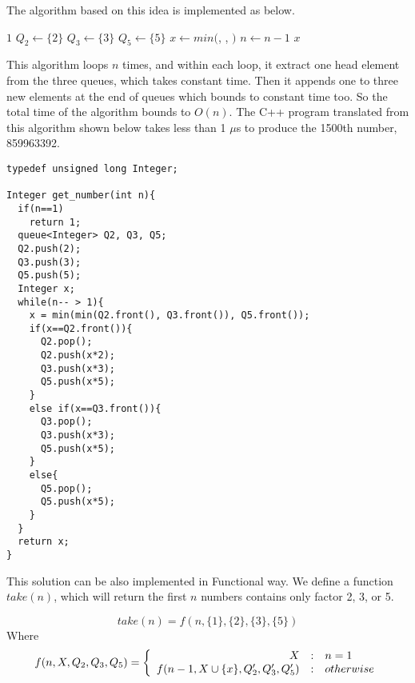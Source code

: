 \documentclass{article}
\begin{document}
The algorithm based on this idea is implemented as below.

\begin{algorithmic}[1]
    \State \Return $1$
  \Else
    \State $Q_2 \gets \{ 2 \}$
    \State $Q_3 \gets \{ 3 \}$
    \State $Q_5 \gets \{ 5 \}$
      \State $x \gets min($, , $)$
        \State {}
        \State {}
        \State {}
        \State {}
        \State {}
        \State {}
        \State {}
      \Else
        \State {}
        \State {}
      \EndIf
      \State $n \gets n - 1$
    \EndWhile
    \State \Return $x$
  \EndIf
\EndFunction
\end{algorithmic}

This algorithm loops $n$ times, and within each loop, it extract one head
element from the three queues, which takes constant time. Then it appends
one to three new elements at the end of queues which bounds to constant time
too. So the total time of the algorithm bounds to $O(n)$. The C++ program
translated from this algorithm shown below takes less than 1 $\mu$s to
produce the 1500th number, 859963392.

\lstset{language=C++}
\begin{lstlisting}
typedef unsigned long Integer;

Integer get_number(int n){
  if(n==1)
    return 1;
  queue<Integer> Q2, Q3, Q5;
  Q2.push(2);
  Q3.push(3);
  Q5.push(5);
  Integer x;
  while(n-- > 1){
    x = min(min(Q2.front(), Q3.front()), Q5.front());
    if(x==Q2.front()){
      Q2.pop();
      Q2.push(x*2);
      Q3.push(x*3);
      Q5.push(x*5);
    }
    else if(x==Q3.front()){
      Q3.pop();
      Q3.push(x*3);
      Q5.push(x*5);
    }
    else{
      Q5.pop();
      Q5.push(x*5);
    }
  }
  return x;
}
\end{lstlisting}

This solution can be also implemented in Functional way. We define
a function $take(n)$, which will return the first $n$ numbers contains
only factor 2, 3, or 5.

\[
  take(n) = f(n, \{1\}, \{2\}, \{3\}, \{5\})
\]
Where
\[
 f(n, X, Q_2, Q_3, Q_5) = \left \{
  \begin{array}{r@{\quad:\quad}l}
  X & n = 1 \\
  f(n-1, X \cup \{x\}, Q_2', Q_3', Q_5') & otherwise
  \end{array}
\right.
\]
\end{document}
